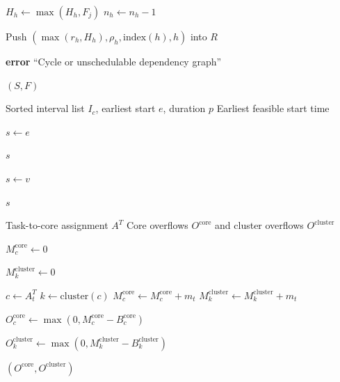\documentclass{article}
\begin{document}
\begin{algorithm}[H]
\begin{algorithmic}[1]
                \State $H_h \gets \max(H_h,F_j)$
                \State $n_h \gets n_h - 1$

                    \State Push $(\max(r_h,H_h),\rho_h,\mathrm{index}(h),h)$ into $R$
                \EndIf
            \EndFor
        \EndWhile

            \State \textbf{error} ``Cycle or unschedulable dependency graph''
        \EndIf

        \State \Return $(S,F)$
    \end{algorithmic}
\end{algorithm}

\begin{algorithm}[H]
    \caption{Find Earliest Gap on Core}
    \label{alg:find_earliest_gap}
    \begin{algorithmic}[1]
        \Require Sorted interval list $I_c$, earliest start $e$, duration $p$
        \Ensure Earliest feasible start time

        \State $s \gets e$

                \State \Return $s$
            \EndIf

                \State $s \gets v$
            \EndIf
        \EndFor

        \State \Return $s$
    \end{algorithmic}
\end{algorithm}

\begin{algorithm}[H]
    \caption{Memory Overflow Penalty}
    \label{alg:memory_overflow}
    \begin{algorithmic}[1]
        \Require Task-to-core assignment $A^T$
        \Ensure Core overflows $O^{\mathrm{core}}$ and cluster overflows $O^{\mathrm{cluster}}$

            \State $M^{\mathrm{core}}_c \gets 0$
        \EndFor

            \State $M^{\mathrm{cluster}}_k \gets 0$
        \EndFor

            \State $c \gets A^T_t$
            \State $k \gets \mathrm{cluster}(c)$
            \State $M^{\mathrm{core}}_c \gets M^{\mathrm{core}}_c + m_t$
            \State $M^{\mathrm{cluster}}_k \gets M^{\mathrm{cluster}}_k + m_t$
        \EndFor

            \State $O^{\mathrm{core}}_c \gets \max(0,M^{\mathrm{core}}_c - B^{\mathrm{core}}_c)$
        \EndFor

            \State $O^{\mathrm{cluster}}_k \gets \max(0,M^{\mathrm{cluster}}_k - B^{\mathrm{cluster}}_k)$
        \EndFor

        \State \Return $(O^{\mathrm{core}},O^{\mathrm{cluster}})$
    \end{algorithmic}
\end{algorithm}
\end{document}

